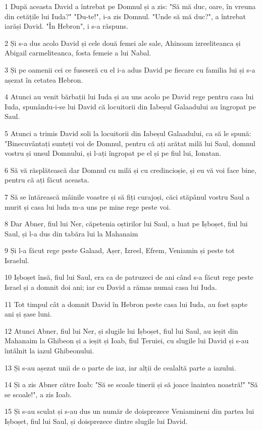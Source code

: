 \par 1 După aceasta David a întrebat pe Domnul și a zis: "Să mă duc, oare, în vreuna din cetățile lui Iuda?" "Du-te!", i-a zis Domnul. "Unde să mă duc?", a întrebat iarăși David. "În Hebron", i s-a răspuns.
\par 2 Și s-a dus acolo David și cele două femei ale sale, Ahinoam izreeliteanca și Abigail carmeliteanca, fosta femeie a lui Nabal.
\par 3 Și pe oamenii cei ce fuseseră cu el i-a adus David pe fiecare cu familia lui și s-a așezat în cetatea Hebron.
\par 4 Atunci au venit bărbații lui Iuda și au uns acolo pe David rege pentru casa lui Iuda, spunându-i-se lui David că locuitorii din Iabeșul Galaadului au îngropat pe Saul.
\par 5 Atunci a trimis David soli la locuitorii din Iabeșul Galaadului, ca să le spună: "Binecuvântați sunteți voi de Domnul, pentru că ați arătat milă lui Saul, domnul vostru și unsul Domnului, și l-ați îngropat pe el și pe fiul lui, Ionatan.
\par 6 Să vă răsplătească dar Domnul cu milă și cu credincioșie, și eu vă voi face bine, pentru că ați făcut aceasta.
\par 7 Să se întărească mâinile voastre și să fiți curajoși, căci stăpânul vostru Saul a murit și casa lui luda m-a uns pe mine rege peste voi.
\par 8 Dar Abner, fiul lui Ner, căpetenia oștirilor lui Saul, a luat pe Ișboșet, fiul lui Saul, și l-a dus din tabăra lui la Mahanaim
\par 9 Și l-a făcut rege peste Galaad, Așer, Izreel, Efrem, Veniamin și peste tot Israelul.
\par 10 Ișboșet însă, fiul lui Saul, era ca de patruzeci de ani când s-a făcut rege peste Israel și a domnit doi ani; iar cu David a rămas numai casa lui Iuda.
\par 11 Tot timpul cât a domnit David în Hebron peste casa lui Iuda, au fost șapte ani și șase luni.
\par 12 Atunci Abner, fiul lui Ner, și slugile lui Ișboșet, fiul lui Saul, au ieșit din Mahanaim la Ghibeon și a ieșit și Ioab, fiul Țeruiei, cu slugile lui David și s-au întâlnit la iazul Ghibeonului.
\par 13 Și s-au așezat unii de o parte de iaz, iar alții de cealaltă parte a iazului.
\par 14 Și a zis Abner către Ioab: "Să se scoale tinerii și să joace înaintea noastră!" "Să se scoale!", a zis Ioab.
\par 15 Și s-au sculat și s-au dus un număr de doisprezece Veniamineni din partea lui Ișboșet, fiul lui Saul, și doisprezece dintre slugile lui David.
